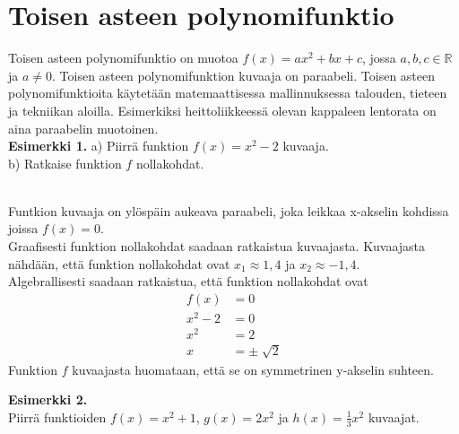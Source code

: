 \chapter{Toisen asteen polynomifunktio}
Toisen asteen polynomifunktio on muotoa $f(x)=ax^2+bx+c$, jossa $a,b,c \in \mathbb{R}$ ja $a \neq 0$. Toisen asteen polynomifunktion kuvaaja on paraabeli. Toisen asteen polynomifunktioita käytetään matemaattisessa mallinnuksessa talouden, tieteen ja tekniikan aloilla. Esimerkiksi heittoliikkeessä olevan kappaleen lentorata on aina paraabelin muotoinen. \\
\textbf{Esimerkki 1.}
a) Piirrä funktion $f(x)=x^2-2$ kuvaaja. \\
b) Ratkaise funktion $f$ nollakohdat. \\ \\

\begin{kuvaajapohja}{1}{-2}{2}{-3}{1}
\end{kuvaajapohja}

Funtkion kuvaaja on ylöspäin aukeava paraabeli, joka leikkaa x-akselin kohdissa joissa $f(x)=0$. \\
Graafisesti funktion nollakohdat saadaan ratkaistua kuvaajasta. Kuvaajasta nähdään, että funktion nollakohdat ovat $x_1 \approx 1,4$ ja $x_2 \approx -1,4$. \\
Algebrallisesti saadaan ratkaistua, että funktion nollakohdat ovat
\begin{align*}
f(x)&=0 \\
x^2-2&=0 \\
x^2&=2 \\
x&= \pm \sqrt[]{2}
\end{align*}
Funktion $f$ kuvaajasta huomataan, että se on symmetrinen y-akselin suhteen.

\textbf{Esimerkki 2.} \\
Piirrä funktioiden $f(x)=x^2+1$, $g(x)=2x^2$ ja $h(x)=\frac{1}{3}x^2$ kuvaajat. \\ \\

\begin{kuvaajapohja}{1}{-2}{2}{-1}{3}
\end{kuvaajapohja}


\begin{kuvaajapohja}{1}{-2}{2}{-1}{3}
\end{kuvaajapohja}

\begin{kuvaajapohja}{1}{-2}{2}{-1}{3}
\end{kuvaajapohja}

